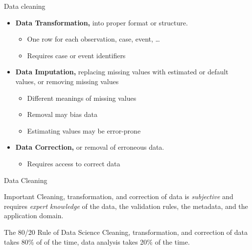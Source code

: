 \documentclass[ignorenonframetext,xcolor=x11names]{beamer}
\begin{document}
\begin{frame}[label=full]{Data cleaning}
\begin{itemize}
	\item \textbf{Data Transformation,} into proper format or structure.
	\begin{itemize}
	  \item One row for each observation, case, event, \ldots
	  \item Requires case or event identifiers
	\end{itemize}
	\item \textbf{Data Imputation,} replacing missing values with estimated or default values, or removing missing values
	\begin{itemize}
	  \item Different meanings of missing values
	  \item Removal may bias data
	  \item Estimating values may be error-prone
	\end{itemize}
	\item \textbf{Data Correction,} or removal of erroneous data.
	\begin{itemize}
	  \item Requires access to correct data
	\end{itemize}
\end{itemize}
\end{frame}

\begin{frame}[label=full]{Data Cleaning}
\begin{block}{Important}
Cleaning, transformation, and correction of data is \emph{subjective} and requires \emph{expert knowledge} of the data, the validation rules, the metadata, and the application domain.
\end{block}
\vspace{5mm}
\begin{block}{The 80/20 Rule of Data Science}
Cleaning, transformation, and correction of data takes 80\% of of the time, data analysis takes 20\% of the time.
\end{block}
\end{frame}
\end{document}
